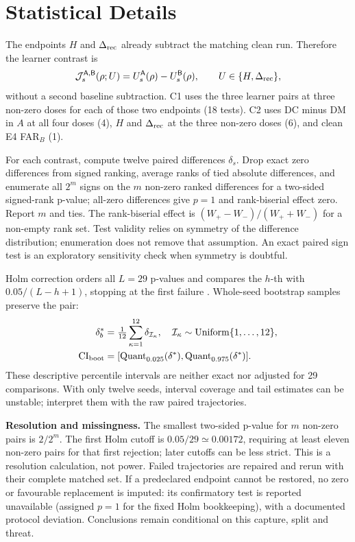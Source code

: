\documentclass[10pt,a4paper]{article}
\begin{document}
\section{Statistical Details}
\label{app:stats}
The endpoints $H$ and $\Delta_{\rm rec}$ already subtract the matching clean run. Therefore the learner contrast is
\begin{equation}
\mathcal J_s^{\mathsf A,\mathsf B}(\rho;U)
=U_s^{\mathsf A}(\rho)-U_s^{\mathsf B}(\rho),\qquad U\in\{H,\Delta_{\rm rec}\},
\label{eq:interaction}
\end{equation}
without a second baseline subtraction. C1 uses the three learner pairs at three non-zero doses for each of those two endpoints (18 tests). C2 uses DC minus DM in $A$ at all four doses (4), $H$ and $\Delta_{\rm rec}$ at the three non-zero doses (6), and clean E4 FAR$_B$ (1).

For each contrast, compute twelve paired differences $\delta_s$. Drop exact zero differences from signed ranking, average ranks of tied absolute differences, and enumerate all $2^m$ signs on the $m$ non-zero ranked differences for a two-sided signed-rank p-value; all-zero differences give $p=1$ and rank-biserial effect zero. Report $m$ and ties. The rank-biserial effect is $(W_+-W_-)/(W_++W_-)$ for a non-empty rank set. Test validity relies on symmetry of the difference distribution; enumeration does not remove that assumption. An exact paired sign test is an exploratory sensitivity check when symmetry is doubtful.

Holm correction orders all $L=29$ p-values and compares the $h$-th with $0.05/(L-h+1)$, stopping at the first failure \cite{holm}. Whole-seed bootstrap samples preserve the pair:
\begin{equation}
\begin{aligned}
\delta_b^*&=\tfrac1{12}\sum_{\kappa=1}^{12}\delta_{\mathcal I_\kappa},\quad
\mathcal I_\kappa\sim\operatorname{Uniform}\{1,\ldots,12\},\\
\mathrm{CI}_{\rm boot}&=[\operatorname{Quant}_{0.025}(\delta^*),\operatorname{Quant}_{0.975}(\delta^*)].
\end{aligned}
\label{eq:bootstrap}
\end{equation}
These descriptive percentile intervals are neither exact nor adjusted for 29 comparisons. With only twelve seeds, interval coverage and tail estimates can be unstable; interpret them with the raw paired trajectories.

\textbf{Resolution and missingness.} The smallest two-sided p-value for $m$ non-zero pairs is $2/2^m$. The first Holm cutoff is $0.05/29\simeq0.00172$, requiring at least eleven non-zero pairs for that first rejection; later cutoffs can be less strict. This is a resolution calculation, not power. Failed trajectories are repaired and rerun with their complete matched set. If a predeclared endpoint cannot be restored, no zero or favourable replacement is imputed: its confirmatory test is reported unavailable (assigned $p=1$ for the fixed Holm bookkeeping), with a documented protocol deviation. Conclusions remain conditional on this capture, split and threat.
\end{document}
